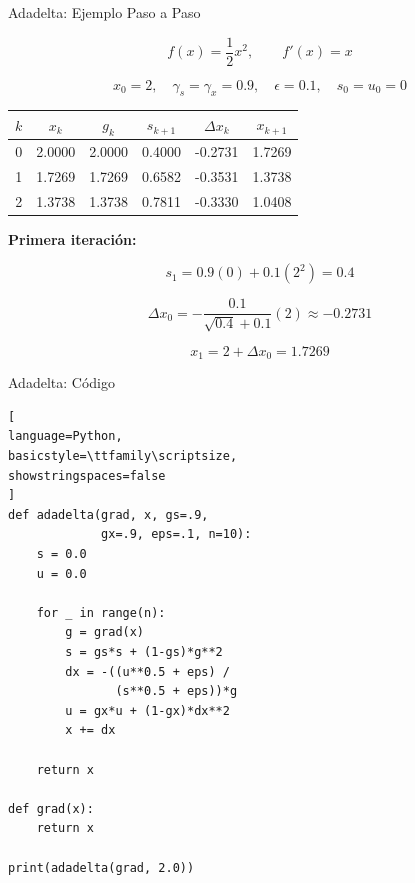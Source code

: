 \begin{frame}{Adadelta: Ejemplo Paso a Paso}

\small

\[
f(x)=\frac12x^2,
\qquad
f'(x)=x
\]

\[
x_0=2,\quad
\gamma_s=\gamma_x=0.9,\quad
\epsilon=0.1,\quad
s_0=u_0=0
\]

\vspace{0.15cm}

\begin{center}
\scriptsize
\begin{tabular}{c|c|c|c|c|c}
\toprule
$k$ & $x_k$ & $g_k$ & $s_{k+1}$ &
$\Delta x_k$ & $x_{k+1}$ \\
\midrule
0 & 2.0000 & 2.0000 & 0.4000 & -0.2731 & 1.7269 \\
1 & 1.7269 & 1.7269 & 0.6582 & -0.3531 & 1.3738 \\
2 & 1.3738 & 1.3738 & 0.7811 & -0.3330 & 1.0408 \\
\bottomrule
\end{tabular}
\end{center}

\vspace{0.15cm}

\footnotesize
\textbf{Primera iteración:}

\[
s_1=0.9(0)+0.1(2^2)=0.4
\]

\[
\Delta x_0=
-\frac{0.1}{\sqrt{0.4}+0.1}(2)
\approx-0.2731
\]

\[
x_1=2+\Delta x_0=1.7269
\]

\end{frame}


\begin{frame}[fragile]{Adadelta: Código}

\begin{lstlisting}[
language=Python,
basicstyle=\ttfamily\scriptsize,
showstringspaces=false
]
def adadelta(grad, x, gs=.9,
             gx=.9, eps=.1, n=10):
    s = 0.0
    u = 0.0

    for _ in range(n):
        g = grad(x)
        s = gs*s + (1-gs)*g**2
        dx = -((u**0.5 + eps) /
               (s**0.5 + eps))*g
        u = gx*u + (1-gx)*dx**2
        x += dx

    return x

def grad(x):
    return x

print(adadelta(grad, 2.0))
\end{lstlisting}

\end{frame}